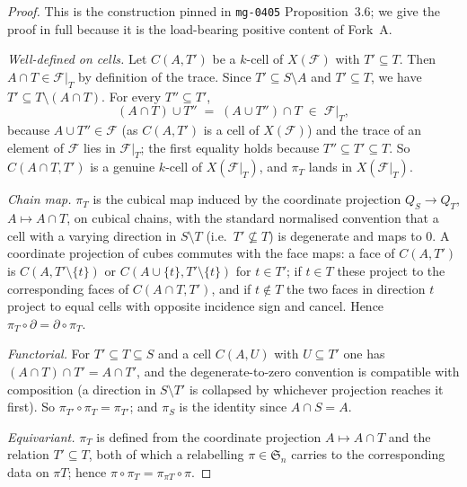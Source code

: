 \documentclass[11pt,oneside]{amsart}
\theoremstyle{plain}
\theoremstyle{definition}
\theoremstyle{remark}
\theoremstyle{honeststyle}
\newcommand{\F}{\mathcal{F}}
\newcommand{\Sym}{\mathfrak{S}}
\begin{document}
\begin{proof}
This is the construction pinned in \texttt{mg-0405} Proposition~3.6; we
give the proof in full because it is the load-bearing positive content
of Fork~A.

\emph{Well-defined on cells.} Let $C(A,T')$ be a $k$-cell of $X(\F)$
with $T'\subseteq T$. Then $A\cap T\in\F|_T$ by definition of the
trace. Since $T'\subseteq S\setminus A$ and $T'\subseteq T$, we have
$T'\subseteq T\setminus(A\cap T)$. For every $T''\subseteq T'$,
\[
  (A\cap T)\cup T''\;=\;(A\cup T'')\cap T\;\in\;\F|_T,
\]
because $A\cup T''\in\F$ (as $C(A,T')$ is a cell of $X(\F)$) and the
trace of an element of $\F$ lies in $\F|_T$; the first equality holds
because $T''\subseteq T'\subseteq T$. So $C(A\cap T,T')$ is a genuine
$k$-cell of $X(\F|_T)$, and $\pi_T$ lands in $X(\F|_T)$.

\emph{Chain map.} $\pi_T$ is the cubical map induced by the coordinate
projection $Q_S\to Q_T$, $A\mapsto A\cap T$, on cubical chains, with
the standard normalised convention that a cell with a varying
direction in $S\setminus T$ (i.e.\ $T'\not\subseteq T$) is degenerate
and maps to $0$. A coordinate projection of cubes commutes with the
face maps: a face of $C(A,T')$ is $C(A,T'\setminus\{t\})$ or
$C(A\cup\{t\},T'\setminus\{t\})$ for $t\in T'$; if $t\in T$ these
project to the corresponding faces of $C(A\cap T,T')$, and if $t\notin
T$ the two faces in direction $t$ project to equal cells with opposite
incidence sign and cancel. Hence $\pi_T\circ\partial=\partial\circ\pi_T$.

\emph{Functorial.} For $T'\subseteq T\subseteq S$ and a cell
$C(A,U)$ with $U\subseteq T'$ one has $(A\cap T)\cap T'=A\cap T'$, and
the degenerate-to-zero convention is compatible with composition (a
direction in $S\setminus T'$ is collapsed by whichever projection
reaches it first). So $\pi_{T'}\circ\pi_T=\pi_{T'}$; and $\pi_S$ is the
identity since $A\cap S=A$.

\emph{Equivariant.} $\pi_T$ is defined from the coordinate projection
$A\mapsto A\cap T$ and the relation $T'\subseteq T$, both of which a
relabelling $\pi\in\Sym_n$ carries to the corresponding data on
$\pi T$; hence $\pi\circ\pi_T=\pi_{\pi T}\circ\pi$.
\end{proof}
\end{document}
